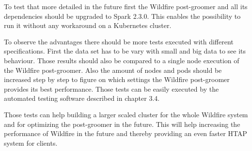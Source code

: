To test that more detailed in the future first the Wildfire post-groomer and all its dependencies should be upgraded to Spark 2.3.0. This enables the possibility to run it without any workaround on a Kubernetes cluster.

To observe the advantages there should be more tests executed with different specifications. First the data set has to be vary with small and big data to see its behaviour. Those results should also be compared to a single node execution of the Wildfire post-groomer. Also the amount of nodes and pods should be increased step by step to figure on which settings the Wildfire post-groomer provides its best performance. Those tests can be easily executed by the automated testing software described in chapter 3.4.

Those tests can help building a larger scaled cluster for the whole Wildfire system and for optimizing the post-groomer in the future. This will help increasing the performance of Wildfire in the future and thereby providing an even faster HTAP system for clients.